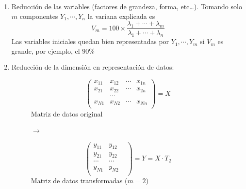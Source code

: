 \documentclass[
]{article}
\providecommand{\tightlist}{%
  \setlength{\itemsep}{0pt}\setlength{\parskip}{0pt}}
\begin{document}
\begin{enumerate}
\def\labelenumi{\arabic{enumi}.}
\tightlist
\item
  Reducción de las variables (factores de grandeza, forma, etc\ldots).
  Tomando solo \(m\) componentes \(Y_1, \cdots, Y_n\) la variana
  explicada es \[
  V_m = 100 \times \frac{\lambda_1+ \cdots + \lambda_m}{\lambda_1+ \cdots + \lambda_n}
  \] Las variables iniciales quedan bien representadas por
  \(Y_1, \cdots, Y_m\) si \(V_m\) es grande, por ejemplo, el \(90\%\)
\item
  Reducción de la dimensión en representación de datos:

  \begin{figure}
    \begin{minipage}{.5\linewidth}
   \centering
   \[\left(\begin{array}{cc}
     x_{11} & x_{12} & \cdots & x_{1n} \\
     x_{21} & x_{22} & \cdots & x_{2n} \\
            & \cdots &                 \\   
     x_{N1} & x_{N2} & \cdots & x_{Nn} \\
   \end{array}\right) = X\]
   Matriz de datos original
    \end{minipage}
  $\longrightarrow$
    \begin{minipage}{.5\linewidth}
   \centering
   \[\left(\begin{array}{cc}
     y_{11} & y_{12} & \\
     y_{21} & y_{22} & \\
      \cdots  & \cdots &  \\   
     y_{N1} & y_{N2} & \\
   \end{array}\right) = Y = X \cdot T_2\]
   Matriz de datos transformadas ($m=2$)
    \end{minipage}
    \end{figure}
\end{enumerate}
\end{document}
